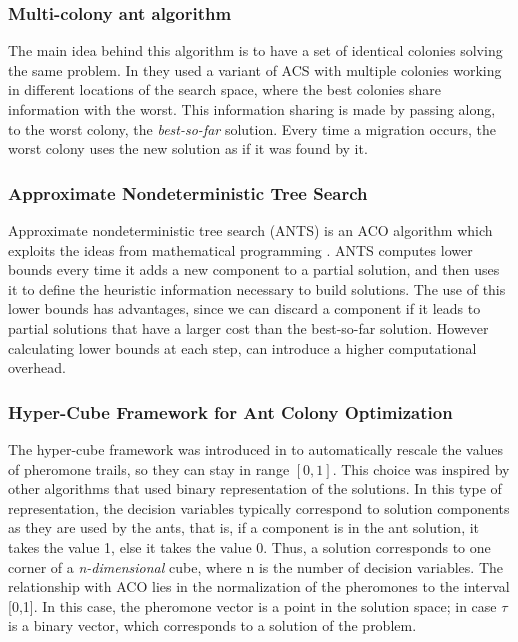 					

					\subsubsection*{Multi-colony ant algorithm}
					The main idea behind this algorithm is to have a set of identical colonies solving the same problem. In \cite{melo10} they used a variant of ACS with multiple colonies working in different locations of the search space, where the best colonies share information with the worst. This information sharing is made by passing along, to the worst colony, the \emph{best-so-far} solution. Every time a migration occurs, the worst colony uses the new solution as if it was found by it.


					\subsubsection*{Approximate Nondeterministic Tree Search}
					Approximate nondeterministic tree search (ANTS) is an ACO algorithm which exploits the ideas from mathematical programming \cite{Maniezzo99}. ANTS computes lower bounds every time it adds a new component to a partial solution, and then uses it to define the heuristic information necessary to build solutions. The use of this lower bounds has advantages, since we can discard a component if it leads to partial solutions that have a larger cost than the best-so-far solution. However calculating lower bounds at each step, can introduce a higher computational overhead.


					\subsubsection*{Hyper-Cube Framework for Ant Colony Optimization}
					The hyper-cube framework was introduced in \cite{blum04} to automatically rescale the values of pheromone trails, so they can stay in range $[0,1]$. This choice was inspired by other algorithms that used binary representation of the solutions. In this type of representation, the decision variables typically correspond to solution components as they are used by the ants, that is, if a component is in the ant solution, it takes the value 1, else it takes the value 0. Thus, a solution corresponds to one corner of a \emph{n-dimensional} cube, where n is the number of decision variables.
					The relationship with ACO lies in the normalization of the pheromones to the interval [0,1]. In this case, the pheromone vector is a point in the solution space; in case $\tau$ is a binary vector, which corresponds to a solution of the problem.
					

